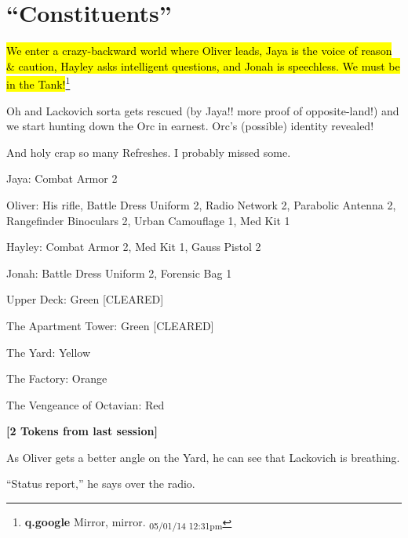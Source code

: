 \setcounter{chapter}{ 21 }
\chapter{\textbf{``Constituents''} }






\hl{We enter a crazy-backward world where Oliver leads, Jaya is the voice of reason \& caution, Hayley asks intelligent questions, and Jonah is speechless.  We must be in the Tank!}\footnote{\textbf{q.google }Mirror, mirror. \textsubscript{05/01/14 12:31pm}}



Oh and Lackovich sorta gets rescued (by Jaya!!  more proof of opposite-land!) and we start hunting down the Orc in earnest.  Orc's (possible) identity revealed!



And holy crap so many Refreshes.  I probably missed some.







{
\parskip=0pt
Jaya: Combat Armor 2

Oliver: His rifle, Battle Dress Uniform 2, Radio Network 2, Parabolic Antenna 2, Rangefinder Binoculars 2, Urban Camouflage 1, Med Kit 1

Hayley: Combat Armor 2, Med Kit 1, Gauss Pistol 2

Jonah: Battle Dress Uniform 2, Forensic Bag 1
}


{
\parskip=0pt
Upper Deck: Green {[}CLEARED{]}

The Apartment Tower: Green {[}CLEARED{]}

The Yard: Yellow

The Factory: Orange

The Vengeance of Octavian: Red
}


\newpage
{}

\textbf{{[}2 Tokens from last session{]}}



As Oliver gets a better angle on the Yard, he can see that Lackovich is breathing.  



``Status report,'' he says over the radio.  



